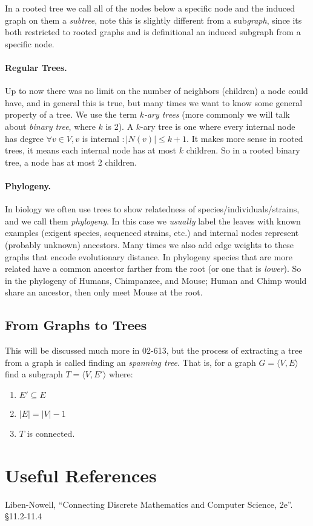 In a rooted tree we call all of the nodes below a specific node and the induced graph on them a \emph{subtree}, 
note this is slightly different from a sub\textit{graph}, since its both restricted to rooted graphs and is definitional an induced subgraph from a specific node. 


\paragraph{Regular Trees.} 
Up to now there was no limit on the number of neighbors (children) a node could have, and in general this is true, but many times we want to know some general property of a tree. 
We use the term \emph{$k$-ary trees} (more commonly we will talk about \emph{binary tree}, where $k$ is 2).
A $k$-ary tree is one where every internal node has degree $\forall v\in V, v $ is internal $: |N(v)| \le k+1$. 
It makes more sense in rooted trees, it means each internal node has at most $k$ children. 
So in a rooted binary tree, a node has at most 2 children. 

\paragraph{Phylogeny.} 
In biology we often use trees to show relatedness of species/individuals/strains, and we call them \emph{phylogeny}. 
In this case we \textit{usually} label the leaves with known examples (exigent species, sequenced strains, etc.) and internal nodes represent (probably unknown) ancestors. 
Many times we also add edge weights to these graphs that encode evolutionary distance. 
In phylogeny species that are more related have a common ancestor farther from the root (or one that is \textit{lower}). 
So in the phylogeny of Humans, Chimpanzee, and Mouse; Human and Chimp would share an ancestor, then only meet Mouse at the root.

\subsection{From Graphs to Trees}
This will be discussed much more in 02-613, but the process of extracting a tree from a graph is called finding an \emph{spanning tree}. 
That is, for a graph $G=\langle V, E\rangle$ find a subgraph $T=\langle V, E'\rangle$ where:
\begin{enumerate}
\item $E' \subseteq E$
\item $|E| = |V|-1$
\item $T$ is connected. 
\end{enumerate}



\section*{Useful References}
Liben-Nowell, ``Connecting Discrete Mathematics and Computer Science, 2e''. \S 11.2-11.4


